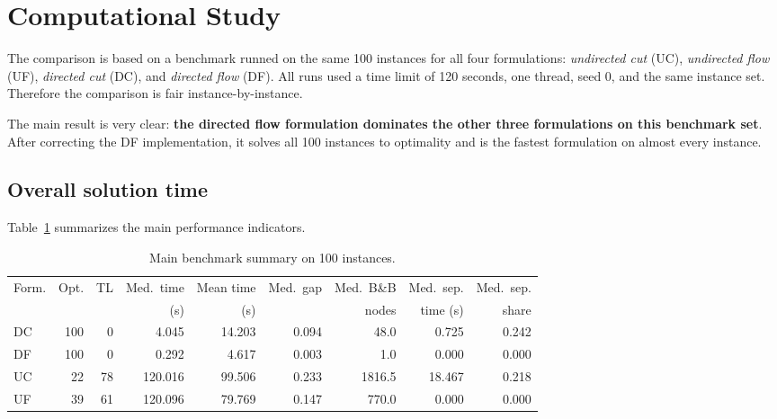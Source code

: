 \section{Computational Study}

The comparison is based on a benchmark runned on the same 100 instances for all four formulations:
\emph{undirected cut} (UC), \emph{undirected flow} (UF),
\emph{directed cut} (DC), and \emph{directed flow} (DF).
All runs used a time limit of 120 seconds, one thread, seed 0, and the same
instance set. Therefore the comparison is fair instance-by-instance.

The main result is very clear: \textbf{the directed flow formulation dominates the
other three formulations on this benchmark set}. After correcting the DF
implementation, it solves all 100 instances to optimality and is the fastest
formulation on almost every instance.

\subsection{Overall solution time}

Table~\ref{tab:exercise4-summary} summarizes the main performance indicators.

\begin{table}[h!]
\centering
\small
\setlength{\tabcolsep}{4pt}
\begin{tabular}{lrrrrrrrr}
\toprule
Form. & Opt. & TL & Med.\ time & Mean time & Med.\ gap & Med.\ B\&B & Med.\ sep. & Med.\ sep. \\
& & & (s) & (s) & & nodes & time (s) & share \\
\midrule
DC & 100 & 0  & 4.045  & 14.203 & 0.094 & 48.0   & 0.725  & 0.242 \\
DF & 100 & 0  & 0.292  & 4.617  & 0.003 & 1.0    & 0.000  & 0.000 \\
UC & 22  & 78 & 120.016 & 99.506 & 0.233 & 1816.5 & 18.467 & 0.218 \\
UF & 39  & 61 & 120.096 & 79.769 & 0.147 & 770.0  & 0.000  & 0.000 \\
\bottomrule
\end{tabular}
\caption{Main benchmark summary on 100 instances.}
\label{tab:exercise4-summary}
\end{table}

%

